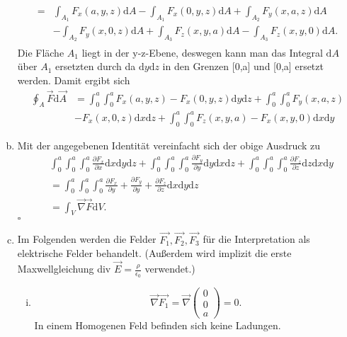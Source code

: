 \begin{enumerate}[(a)]
\begin{align}
\begin{split}
  = &\int_{A_{1}} F_{x}(a,y,z) \mathrm{d}A - \int_{A_{1}} F_{x}(0,y,z)\mathrm{d}A + \int_{A_{2}} F_{y}(x,a,z)\mathrm{d}A \\ 
  & - \int_{A_{2}} F_{y}(x,0,z)\mathrm{d}A + \int_{A_{3}} F_{z}(x,y,a)\mathrm{d}A - \int_{A_{3}} F_{z}(x,y,0)\mathrm{d}A.
\end{split}
\end{align}
Die Fläche $A_{1}$ liegt in der y-z-Ebene, deswegen kann man das Integral $\mathrm{d}A$ über $A_{1}$ ersetzten durch da $\mathrm{d}y \mathrm{d}z$ in den Grenzen [0,a] und [0,a] ersetzt werden. Damit ergibt sich
\begin{align*}
	\oint_A \vec{F}\mathrm{d}\vec{A}  &= \int_0^a\int_0^a F_{x}(a,y,z) - F_{x}(0,y,z) \mathrm{d}y \mathrm{d}z + \int_0^a\int_0^a F_{y}(x,a,z) \\ &- F_{x}(x,0,z) \mathrm{d}x \mathrm{d}z + \int_0^a\int_0^a F_{z}(x,y,a) - F_{x}(x,y,0) \mathrm{d}x \mathrm{d}y
\end{align*} 
\item Mit der angegebenen Identität vereinfacht sich der obige Ausdruck zu
\begin{align*}
&\int_0^a \int_0^a \int_0^a \frac{\partial F_{x}}{\partial x} \mathrm{d}x\mathrm{d}y\mathrm{d}z + \int_0^a \int_0^a \int_0^a \frac{\partial F_{y}}{\partial y} \mathrm{d}y\mathrm{d}x\mathrm{d}z + 
\int_0^a \int_0^a \int_0^a \frac{\partial F_{z}}{\partial z} \mathrm{d}z\mathrm{d}x\mathrm{d}y
\\ &= \int_0^a \int_0^a \int_0^a  \frac{\partial F_{x}}{\partial y} +  \frac{\partial F_{y}}{\partial y} + \frac{\partial F_{z}}{\partial z} \mathrm{d}x\mathrm{d}y\mathrm{d}z
\\ &= \int_V \vec{\nabla}  \vec{F} \mathrm{d}V.
\end{align*}
\hfill $\square$ 
\item
Im Folgenden werden die Felder $\vec{F_{1}}, \vec{F_{2}}, \vec{F_{3}}$ für die Interpretation als elektrische Felder behandelt. (Außerdem wird implizit die erste Maxwellgleichung div $\vec{E} =  \frac{\rho}{\epsilon_{0}}$ verwendet.)
\begin{enumerate}[(i)]
\item 
\begin{equation}
\vec{\nabla}  \vec{F_{1}} = \vec{\nabla}  \begin{pmatrix} 0 \\ 0 \\ a \end{pmatrix} = 0.
\end{equation}
In einem Homogenen Feld befinden sich keine Ladungen.

\end{enumerate}
\end{enumerate}
